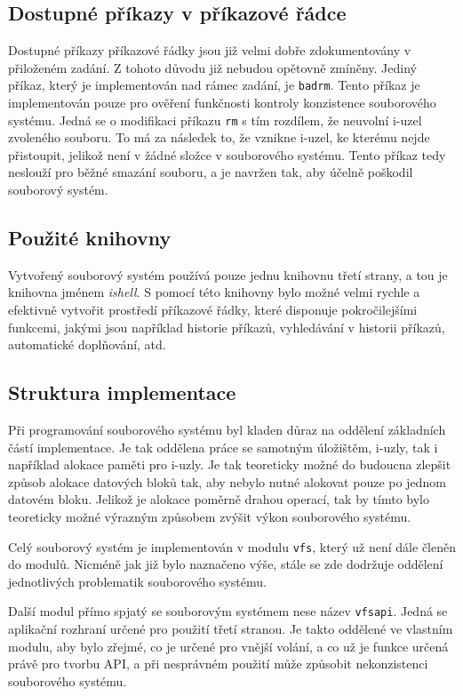 \documentclass[12pt, a4paper]{article}
\begin{document}
    \subsection{Dostupné příkazy v příkazové řádce}
    Dostupné příkazy příkazové řádky jsou již velmi dobře zdokumentovány v přiloženém zadání.
    Z tohoto důvodu již nebudou opětovně zmíněny.
    Jediný příkaz, který je implementován nad rámec zadání, je \texttt{badrm}.
    Tento příkaz je implementován pouze pro ověření funkčnosti kontroly konzistence souborového systému.
    Jedná se o modifikaci příkazu \texttt{rm} s tím rozdílem, že neuvolní i-uzel zvoleného souboru.
    To má za následek to, že vznikne i-uzel, ke kterému nejde přistoupit, jelikož není v žádné složce v souborového systému.
    Tento příkaz tedy neslouží pro běžné smazání souboru, a je navržen tak, aby účelně poškodil souborový systém.


    \subsection{Použité knihovny}
    Vytvořený souborový systém používá pouze jednu knihovnu třetí strany, a tou je knihovna jménem \textit{ishell}.
    S pomocí této knihovny bylo možné velmi rychle a efektivně vytvořit prostředí příkazové řádky, které disponuje pokročilejšími funkcemi, jakými jsou například historie příkazů, vyhledávání v historii příkazů, automatické doplňování, atd.

    \subsection{Struktura implementace}
    Při programování souborového systému byl kladen důraz na oddělení základních částí implementace.
    Je tak oddělena práce se samotným úložištěm, i-uzly, tak i například alokace paměti pro i-uzly.
    Je tak teoreticky možné do budoucna zlepšit způsob alokace datových bloků tak, aby nebylo nutné alokovat pouze po jednom datovém bloku.
    Jelikož je alokace poměrně drahou operací, tak by tímto bylo teoreticky možné výrazným způsobem zvýšit výkon souborového systému.

    Celý souborový systém je implementován v modulu \texttt{vfs}, který už není dále členěn do modulů.
    Nicméně jak již bylo naznačeno výše, stále se zde dodržuje oddělení jednotlivých problematik souborového systému.

    Další modul přímo spjatý se souborovým systémem nese název \texttt{vfsapi}.
    Jedná se aplikační rozhraní určené pro použití třetí stranou.
    Je takto oddělené ve vlastním modulu, aby bylo zřejmé, co je určené pro vnější volání, a co už je funkce určená právě pro tvorbu API, a při nesprávném použití může způsobit nekonzistenci souborového systému.
\end{document}
